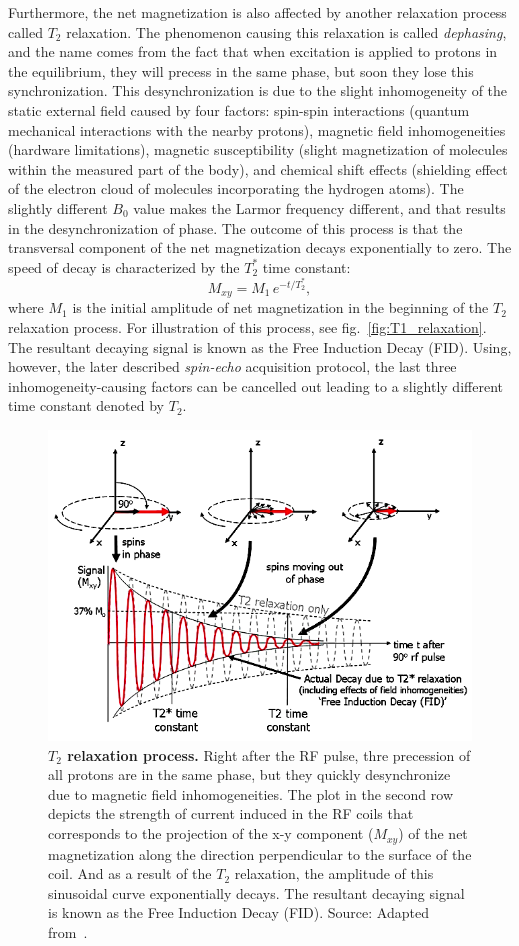 Furthermore, the net magnetization is also affected by another relaxation process called $T_2$ relaxation. The phenomenon causing this relaxation is called \textit{dephasing}, and the name comes from the fact that when excitation is applied to protons in the equilibrium, they will precess in the same phase, but soon they lose this synchronization. This desynchronization is due to the slight inhomogeneity of the static external field caused by four factors: spin-spin interactions (quantum mechanical interactions with the nearby protons), magnetic field inhomogeneities (hardware limitations), magnetic susceptibility (slight magnetization of molecules within the measured part of the body), and chemical shift effects (shielding effect of the electron cloud of molecules incorporating the hydrogen atoms). The slightly different $B_0$ value makes the Larmor frequency different, and that results in the desynchronization of phase. The outcome of this process is that the transversal component of the net magnetization decays exponentially to zero. The speed of decay is characterized by the $T_2^*$ time constant:
\[M_{xy} = M_1\,e^{-t/T_2^*},\]
where $M_1$ is the initial amplitude of net magnetization in the beginning of the $T_2$ relaxation process. For illustration of this process, see fig.~\ref{fig:T1_relaxation}. The resultant decaying signal is known as the Free Induction Decay (FID). Using, however, the later described \textit{spin-echo} acquisition protocol, the last three inhomogeneity-causing factors can be cancelled out leading to a slightly different time constant denoted by $T_2$.

\begin{figure}[thb]
    \centering
    \includegraphics[width=0.8\linewidth]{images/T2_relaxation.png}
    \caption{\textbf{$T_2$ relaxation process.} Right after the RF pulse, thre precession of all protons are in the same phase, but they quickly desynchronize due to magnetic field inhomogeneities. The plot in the second row depicts the strength of current induced in the RF coils that corresponds to the projection of the x-y component ($M_{xy}$) of the net magnetization along the direction perpendicular to the surface of the coil. And as a result of the $T_2$ relaxation, the amplitude of this sinusoidal curve exponentially decays. The resultant decaying signal is known as the Free Induction Decay (FID). Source: Adapted from~\cite{ridgway_cardiovascular_2010}.}
    \label{fig:T2_relaxation}
\end{figure}

